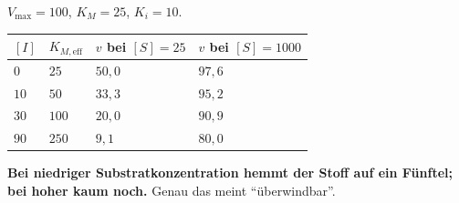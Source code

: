 \begin{merksatz}
$V_{\max}=100$, $K_M=25$, $K_i=10$.

\begin{center}
{\small
\renewcommand{\arraystretch}{1.48}
\begin{tabular}{@{}P{1.6cm}P{2.0cm}P{2.0cm}P{2.2cm}@{}}
\toprule
$[I]$ & $K_{M,\text{eff}}$ & $v$ bei $[S]=25$ & $v$ bei $[S]=1000$\\
\midrule
$0$ & $25$ & $50{,}0$ & $97{,}6$\\
$10$ & $50$ & $33{,}3$ & $95{,}2$\\
$30$ & $100$ & $20{,}0$ & $90{,}9$\\
$90$ & $250$ & $9{,}1$ & $80{,}0$\\
\bottomrule
\end{tabular}}
\end{center}

\begin{center}
\begin{minipage}{0.9\textwidth}
\textbf{Bei niedriger Substratkonzentration hemmt der Stoff auf ein Fünftel; bei hoher kaum noch.} Genau das meint \enquote{überwindbar}.
\end{minipage}
\end{center}

\begin{center}
\begin{minipage}{0.88\textwidth}
\end{minipage}
\end{center}
\end{merksatz}

